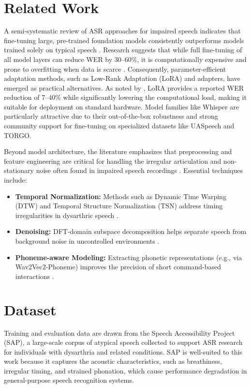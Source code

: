 \documentclass[11pt]{article}
\begin{document}
\section{Related Work}

A semi-systematic review of ASR approaches for impaired speech indicates that fine-tuning large, pre-trained foundation models consistently outperforms models trained solely on typical speech \citep{voicebridge_litreview}. Research suggests that while full fine-tuning of all model layers can reduce WER by 30–60\%, it is computationally expensive and prone to overfitting when data is scarce \citep{voicebridge_litreview}. Consequently, parameter-efficient adaptation methods, such as Low-Rank Adaptation (LoRA) and adapters, have emerged as practical alternatives. As noted by \citet{pokel2025variational}, LoRA provides a reported WER reduction of 7–40\% while significantly lowering the computational load, making it suitable for deployment on standard hardware. Model families like Whisper are particularly attractive due to their out-of-the-box robustness and strong community support for fine-tuning on specialized datasets like UASpeech and TORGO.

Beyond model architecture, the literature emphasizes that preprocessing and feature engineering are critical for handling the irregular articulation and non-stationary noise often found in impaired speech recordings \citep{voicebridge_litreview}. Essential techniques include:

\begin{itemize}
\item \textbf{Temporal Normalization:} Methods such as Dynamic Time Warping (DTW) and Temporal Structure Normalization (TSN) address timing irregularities in dysarthric speech \citep{normalization_wav2vec}.
\item \textbf{Denoising:} DFT-domain subspace decomposition helps separate speech from background noise in uncontrolled environments \citep{sciencedirect_dysarthric}.
\item \textbf{Phoneme-aware Modeling:} Extracting phonetic representations (e.g., via Wav2Vec2-Phoneme) improves the precision of short command-based interactions \citep{huggingface_wav2vec2}.
\end{itemize}

\section{Dataset}

Training and evaluation data are drawn from the Speech Accessibility Project (SAP), a large-scale corpus of atypical speech collected to support ASR research for individuals with dysarthria and related conditions. SAP is well-suited to this work because it captures the acoustic characteristics, such as breathiness, irregular timing, and strained phonation, which cause performance degradation in general-purpose speech recognition systems.
\end{document}
